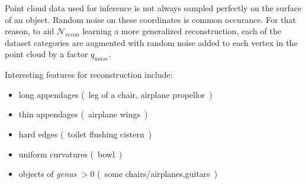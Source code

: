 Point cloud data used for inference is not always sampled perfectly on the surface of an object. Random noise on these coordinates is common occurance.
For that reason, to aid $\mathcal{N}_{recon}$ learning a more generalized reconstruction, each of the dataset categories are
 augmented with random noise added to each vertex in the point cloud by a factor $q_{noise}$.

 Interesting features for reconstruction include:
 \begin{itemize}
   \item long appendages (~leg of a chair, airplane propellor~)
   \item thin appendages (~airplane wings~)
   \item hard edges (~toilet flushing cistern~)
   \item uniform curvatures (~bowl~)
   \item objects of \emph{genus} $>0$ (~some chairs/airplanes,guitars~)
 \end{itemize}
